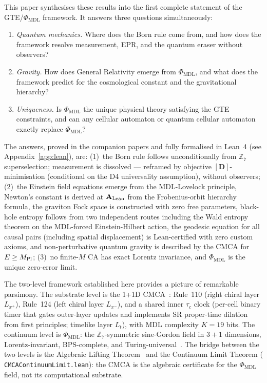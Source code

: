 \documentclass[11pt]{article}
\theoremstyle{remark}
\newcommand{\PHIMDL}{\Phi_{\mathrm{MDL}}}
\newcommand{\ZS}{\mathbb{Z}_7}
\newcommand{\lean}[1]{%
  \penalty-100
  \begingroup\def\_{\textunderscore\allowbreak}\texttt{#1}\endgroup}
\newcommand{\CatAL}{\ensuremath{\textbf{A}_{\rm Lean}}}
\begin{document}
This paper synthesises these results into the first complete statement of
the GTE/$\PHIMDL$ framework.  It answers three questions simultaneously:

\begin{enumerate}[noitemsep]
\item \textit{Quantum mechanics.} Where does the Born rule come from, and
  how does the framework resolve measurement, EPR, and the quantum eraser
  without observers?
\item \textit{Gravity.} How does General Relativity emerge from $\PHIMDL$,
  and what does the framework predict for the cosmological constant and the
  gravitational hierarchy?
\item \textit{Uniqueness.} Is $\PHIMDL$ the unique physical theory satisfying the GTE constraints, and can any cellular automaton or quantum cellular
  automaton exactly replace $\PHIMDL$?
\end{enumerate}

The answers, proved in the companion papers and fully formalised in Lean~4
(see Appendix~\ref{app:lean}), are: (1)~the Born rule follows unconditionally
from $\ZS$ superselection; measurement is dissolved --- reframed by objective $[\mathbf{D}]$-minimisation
(conditional on the D4 universality assumption), without observers; (2)~the Einstein field equations emerge from the MDL-Lovelock
principle, Newton's constant is derived at $\CatAL$ from the Frobenius-orbit
hierarchy formula, the graviton Fock space is constructed with zero free parameters,
black-hole entropy follows from two independent routes including the Wald entropy
theorem on the MDL-forced Einstein-Hilbert action, the geodesic equation for
all causal pairs (including spatial displacement) is Lean-certified with zero custom axioms, and non-perturbative
quantum gravity is described by the CMCA for $E\geq M_{\rm Pl}$;
(3)~no finite-$M$ CA has exact Lorentz invariance, and $\PHIMDL$ is the unique
zero-error limit.

\medskip

The two-level framework established here provides a picture of remarkable
parsimony.  The substrate level is the 1+1D CMCA~\cite{SpivackCMCA}: Rule~110
(right chiral layer $L_{x^+}$), Rule~124 (left chiral layer $L_{x^-}$), and
a shared inner $\tau_c$ clock (per-cell binary timer that gates outer-layer
updates and implements SR proper-time dilation from first principles; timelike
layer $L_t$), with MDL complexity
$K = 19$ bits.  The continuum level is $\PHIMDL$: the $\ZS$-symmetric
sine-Gordon field in $3+1$ dimensions, Lorentz-invariant, BPS-complete, and
Turing-universal~\cite{SpivackPhiMDLField}.  The bridge between the two levels
is the Algebraic Lifting Theorem~\cite{SpivackCMCA} and the Continuum Limit
Theorem (\lean{CMCAContinuumLimit.lean}): the CMCA is the algebraic certificate
for the $\PHIMDL$ field, not its computational substrate.
\end{document}
